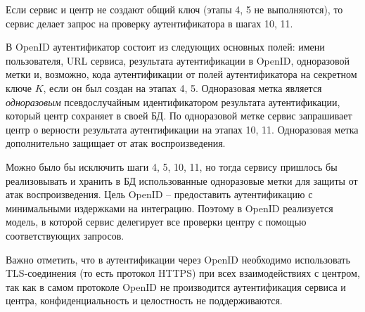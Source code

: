 Если сервис и центр не создают общий ключ (этапы 4, 5 не выполняются), то сервис делает запрос на проверку аутентификатора в шагах 10, 11.

В OpenID аутентификатор состоит из следующих основных полей: имени пользователя, URL сервиса, результата аутентификации в OpenID, одноразовой метки и, возможно, кода аутентификации от полей аутентификатора на секретном ключе $K$, если он был создан на этапах 4, 5. Одноразовая метка является \emph{одноразовым} псевдослучайным идентификатором результата аутентификации, который центр сохраняет в своей БД. По одноразовой метке сервис запрашивает центр о верности результата аутентификации на этапах 10, 11. Одноразовая метка дополнительно защищает от атак воспроизведения.

Можно было бы исключить шаги 4, 5, 10, 11, но тогда сервису пришлось бы реализовывать и хранить в БД использованные одноразовые метки для защиты от атак воспроизведения. Цель OpenID -- предоставить аутентификацию с минимальными издержками на интеграцию. Поэтому в OpenID реализуется модель, в которой сервис делегирует все проверки центру с помощью соответствующих запросов.

Важно отметить, что в аутентификации через OpenID необходимо использовать TLS-соединения (то есть протокол HTTPS) при всех взаимодействиях с центром, так как в самом протоколе OpenID не производится аутентификация сервиса и центра, конфиденциальность и целостность не поддерживаются.
